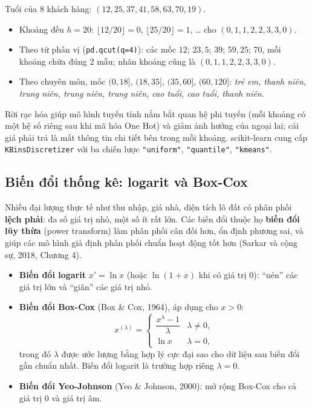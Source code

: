 \begin{example}
Tuổi của 8 khách hàng: $(12, 25, 37, 41, 58, 63, 70, 19)$.
\begin{itemize}
    \item Khoảng đều $h = 20$: $\lfloor 12/20 \rfloor = 0$, $\lfloor 25/20 \rfloor = 1$, \ldots{} cho $(0, 1, 1, 2, 2, 3, 3, 0)$.
    \item Theo tứ phân vị (\texttt{pd.qcut(q=4)}): các mốc $12$; $23{,}5$; $39$; $59{,}25$; $70$, mỗi khoảng chứa đúng 2 mẫu; nhãn khoảng cũng là $(0, 1, 1, 2, 2, 3, 3, 0)$.
    \item Theo chuyên môn, mốc $(0, 18]$, $(18, 35]$, $(35, 60]$, $(60, 120]$: \textit{trẻ em, thanh niên, trung niên, trung niên, trung niên, cao tuổi, cao tuổi, thanh niên}.
\end{itemize}
\end{example}

Rời rạc hóa giúp mô hình tuyến tính nắm bắt quan hệ phi tuyến (mỗi khoảng có một hệ số riêng sau khi mã hóa One Hot) và giảm ảnh hưởng của ngoại lai; cái giá phải trả là mất thông tin chi tiết bên trong mỗi khoảng. scikit-learn cung cấp \texttt{KBinsDiscretizer} với ba chiến lược \texttt{"uniform"}, \texttt{"quantile"}, \texttt{"kmeans"}.

\subsection{Biến đổi thống kê: logarit và Box-Cox}

Nhiều đại lượng thực tế như thu nhập, giá nhà, diện tích lô đất có phân phối \textbf{lệch phải}: đa số giá trị nhỏ, một số ít rất lớn. Các biến đổi thuộc họ \textbf{biến đổi lũy thừa} (power transform) làm phân phối cân đối hơn, ổn định phương sai, và giúp các mô hình giả định phân phối chuẩn hoạt động tốt hơn (Sarkar và cộng sự, 2018, Chương 4).

\begin{itemize}
    \item \textbf{Biến đổi logarit} $x' = \ln x$ (hoặc $\ln(1 + x)$ khi có giá trị 0): ``nén'' các giá trị lớn và ``giãn'' các giá trị nhỏ.
    \item \textbf{Biến đổi Box-Cox} (Box \& Cox, 1964), áp dụng cho $x > 0$:
    \begin{equation}
        x^{(\lambda)} = \begin{cases} \dfrac{x^{\lambda} - 1}{\lambda} & \lambda \neq 0, \\[6pt] \ln x & \lambda = 0, \end{cases}
    \end{equation}
    trong đó $\lambda$ được ước lượng bằng hợp lý cực đại sao cho dữ liệu sau biến đổi gần chuẩn nhất. Biến đổi logarit là trường hợp riêng $\lambda = 0$.
    \item \textbf{Biến đổi Yeo-Johnson} (Yeo \& Johnson, 2000): mở rộng Box-Cox cho cả giá trị 0 và giá trị âm.
\end{itemize}

